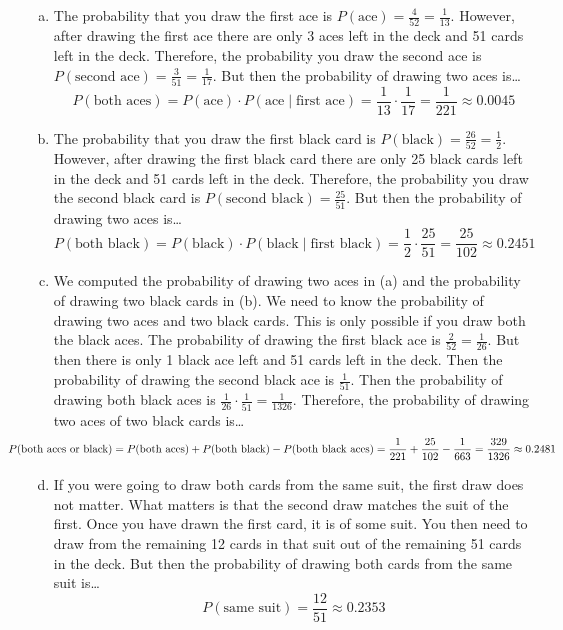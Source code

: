 \documentclass[11pt,letterpaper]{article}
\begin{document}
\sol 
\begin{enumerate}[(a)]
\item The probability that you draw the first ace is $P(\text{ace})= \frac{4}{52}= \frac{1}{13}$. However, after drawing the first ace there are only 3 aces left in the deck and 51 cards left in the deck. Therefore, the probability you draw the second ace is $P(\text{second ace})= \frac{3}{51}= \frac{1}{17}$. But then the probability of drawing two aces is\dots
	\[
	P(\text{both aces})= P(\text{ace}) \cdot P(\text{ace} \;|\; \text{first ace})= \dfrac{1}{13} \cdot \dfrac{1}{17}= \dfrac{1}{221} \approx 0.0045
	\] \pspace

\item The probability that you draw the first black card is $P(\text{black})= \frac{26}{52}= \frac{1}{2}$. However, after drawing the first black card there are only 25 black cards left in the deck and 51 cards left in the deck. Therefore, the probability you draw the second black card is $P(\text{second black})= \frac{25}{51}$. But then the probability of drawing two aces is\dots
	\[
	P(\text{both black})= P(\text{black}) \cdot P(\text{black} \;|\; \text{first black})= \dfrac{1}{2} \cdot \dfrac{25}{51}= \dfrac{25}{102} \approx 0.2451
	\] \pspace

\item We computed the probability of drawing two aces in (a) and the probability of drawing two black cards in (b). We need to know the probability of drawing two aces and two black cards. This is only possible if you draw both the black aces. The probability of drawing the first black ace is $\frac{2}{52}= \frac{1}{26}$. But then there is only 1 black ace left and 51 cards left in the deck. Then the probability of drawing the second black ace is $\frac{1}{51}$. Then the probability of drawing both black aces is $\frac{1}{26} \cdot \frac{1}{51}= \frac{1}{1326}$. Therefore, the probability of drawing two aces of two black cards is\dots
	\[
	\hspace{-1.5cm} P(\text{both aces or black})= P(\text{both aces}) + P(\text{both black}) - P(\text{both black aces})= \dfrac{1}{221} + \dfrac{25}{102} - \dfrac{1}{663}= \dfrac{329}{1326} \approx 0.2481
	\] \pspace



\item If you were going to draw both cards from the same suit, the first draw does not matter. What matters is that the second draw matches the suit of the first. Once you have drawn the first card, it is of some suit. You then need to draw from the remaining 12 cards in that suit out of the remaining 51 cards in the deck. But then the probability of drawing both cards from the same suit is\dots
	\[
	P(\text{same suit})= \dfrac{12}{51} \approx 0.2353
	\]
\end{enumerate}
\end{document}
